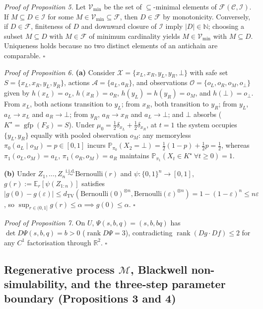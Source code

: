 \documentclass[12pt,letterpaper]{article}
\begin{document}
\emph{Proof of Proposition 5.} Let \(\mathcal{V}_{\min}\) be the set of
\(\subseteq\)-minimal elements of
\(\mathcal{F}(\mathcal{C}, \mathcal{I})\). If
\(M \subseteq D \in \mathcal{I}\) for some
\(M \in \mathcal{V}_{\min} \subseteq \mathcal{F}\), then
\(D \in \mathcal{F}\) by monotonicity. Conversely, if
\(D \in \mathcal{F}\), finiteness of \(D\) and downward closure of
\(\mathcal{I}\) imply \(|D| \in \mathbb{N}\); choosing a subset
\(M \subseteq D\) with \(M \in \mathcal{F}\) of minimum cardinality
yields \(M \in \mathcal{V}_{\min}\) with \(M \subseteq D\). Uniqueness
holds because no two distinct elements of an antichain are comparable.
\(\square\)

\emph{Proof of Proposition 6.} \textbf{(a)} Consider
\(\mathcal{X} = \{x_L, x_R, y_L, y_R, \bot\}\) with safe set
\(S = \{x_L, x_R, y_L, y_R\}\), actions \(\mathcal{A} = \{a_L, a_R\}\),
and observations \(\mathcal{O} = \{o_L, o_R, o_M, o_\bot\}\) given by
\(h(x_L) = o_L\), \(h(x_R) = o_R\), \(h(y_L) = h(y_R) = o_M\), and
\(h(\bot) = o_\bot\). From \(x_L\), both actions transition to \(y_L\);
from \(x_R\), both transition to \(y_R\); from \(y_L\), \(a_L \to x_L\)
and \(a_R \to \bot\); from \(y_R\), \(a_R \to x_R\) and
\(a_L \to \bot\); and \(\bot\) absorbs
(\(K^\star = \operatorname{gfp}(F_S) = S\)). Under
\(\mu_0 = \frac{1}{2}\delta_{x_L} + \frac{1}{2}\delta_{x_R}\), at
\(t=1\) the system occupies \(\{y_L, y_R\}\) equally with pooled
observation \(o_M\): any memoryless
\(\pi_0(a_L \mid o_M) = p \in [0,1]\) incurs
\(\mathbb{P}_{\pi_0}(X_2 = \bot) = \frac{1}{2}(1 - p) + \frac{1}{2} p = \frac{1}{2}\),
whereas \(\pi_1(o_L, o_M) = a_L\), \(\pi_1(o_R, o_M) = a_R\) maintains
\(\mathbb{P}_{\pi_1}(X_t \in K^\star\ \forall t \ge 0) = 1\).

\textbf{(b)} Under
\(Z_1, \dots, Z_n \stackrel{\mathrm{i.i.d.}}{\sim} \mathrm{Bernoulli}(r)\)
and \(\psi: \{0,1\}^n \to [0,1]\),
\(g(r) := \mathbb{E}_r[\psi(Z_{1:n})]\) satisfies
\(|g(0) - g(\varepsilon)| \le d_{\mathrm{TV}}(\mathrm{Bernoulli}(0)^{\otimes n}, \mathrm{Bernoulli}(\varepsilon)^{\otimes n}) = 1 - (1-\varepsilon)^n \le n\varepsilon\)
\citep{leCam1973, mayo2018}, so
\(\sup_{r \in (0,1]} g(r) \le \alpha \implies g(0) \le \alpha\).
\(\square\)

\emph{Proof of Proposition 7.} On \(U\), \(\Psi(s,b,q) = (s, b, bq)\)
has \(\det D\Psi(s,b,q) = b > 0\) (\(\operatorname{rank} D\Psi = 3\)),
contradicting \(\operatorname{rank}(Dg \cdot Df) \le 2\) for any \(C^1\)
factorisation through \(\mathbb{R}^2\). \(\square\)

\subsection{\texorpdfstring{Regenerative process \(\mathcal{M}\),
Blackwell non-simulability, and the three-step parameter boundary
(Propositions 3 and
4)}{Regenerative process \textbackslash mathcal\{M\}, Blackwell non-simulability, and the three-step parameter boundary (Propositions 3 and 4)}}\label{regenerative-process-mathcalm-blackwell-non-simulability-and-the-three-step-parameter-boundary-propositions-3-and-4}
\end{document}

